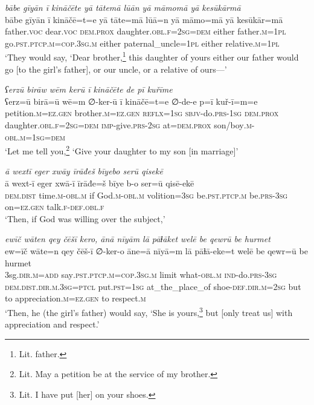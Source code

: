 \ea \label{RE.4}
\textit{bābe gīyān ī kināčēte yā tātemā lūān yā māmomā yā kesūkārmā} \\ 
\gll bābe gīyān ī kināčē=t=e yā tāte=mā lūā=n yā māmo=mā yā kesūkār=mā \\ 
 father.\textsc{voc} dear.\textsc{voc} \textsc{dem.prox} daughter\textsc{.obl}\textsc{.f}\textsc{=\textsc{2sg}}\textsc{=dem} either father\textsc{.m}\textsc{=\textsc{1pl}} go\textsc{.pst}\textsc{.ptcp}\textsc{.m}\textsc{=cop}\textsc{.3sg}\textsc{.m} either paternal\_uncle\textsc{=\textsc{1pl}} either relative\textsc{.m}\textsc{=\textsc{1pl}} \\ 
\glt `They would say, ‘Dear brother,\footnote{Lit. father.} this daughter of yours \—either our father would go [to the girl’s father], or our uncle, or a relative of ours—'
\z 
 
\ea \label{RE.7}
\textit{ʕerzū birāw wēm kerū ī kināčēte de pī kuřīme} \\ 
\gll ʕerz=ū birā=ū wē=m ∅-ker-ū ī kināčē=t=e ∅-de-e p=ī kuř-ī=m=e \\ 
 petition\textsc{.m}\textsc{\textsc{=ez.gen}} brother\textsc{.m}\textsc{\textsc{=ez.gen}} \textsc{reflx}\textsc{=\textsc{1sg}} \textsc{sbjv-}do\textsc{.prs}\textsc{-\textsc{1sg}} \textsc{dem.prox} daughter\textsc{.obl}\textsc{.f}\textsc{=\textsc{2sg}}\textsc{=dem} \textsc{imp-}give\textsc{.prs}-\textsc{2sg} at=\textsc{dem.prox} son/boy\textsc{.m}\textsc{-obl}\textsc{.m}\textsc{=\textsc{1sg}}\textsc{=dem} \\ 
\glt `Let me tell you,\footnote{Lit. May a petition be at the service of my brother.} ‘Give your daughter to my son [in marriage]'
\z 
 
\ea \label{RE.8}
\textit{ā wextī eger xwāy īrāđeš bīyebo serū qisekē} \\ 
\gll ā wext-ī eger xwā-ī īrāđe=š bīye b-o ser=ū qisē-ekē \\ 
 \textsc{dem.dist} time\textsc{.m}\textsc{-obl}\textsc{.m} if God\textsc{.m}\textsc{-obl}\textsc{.m} volition\textsc{=3sg} be\textsc{.pst}\textsc{.ptcp}\textsc{.m} be\textsc{.prs}\textsc{-3sg} on\textsc{\textsc{=ez.gen}} talk\textsc{.f}\textsc{-def}\textsc{.obl}\textsc{.f} \\ 
\glt `Then, if God was willing over the subject,'
\z 
 
\ea \label{RE.10}
\textit{ewīč wāten qey čēšī kero, ānā nīyām lā pāɫāket welē be qewrū be hurmet} \\ 
\gll ew=īč wāte=n qey čēš-ī ∅-ker-o āne=ā nīyā=m lā pāɫā-eke=t welē be qewr=ū be hurmet \\ 
 3sg\textsc{.dir}\textsc{.m}\textsc{=add} say\textsc{.pst}\textsc{.ptcp}\textsc{.m}\textsc{=cop}\textsc{.3sg}\textsc{.m} limit what\textsc{-obl}\textsc{.m} \textsc{ind-}do\textsc{.prs}\textsc{-3sg} \textsc{dem.dist}\textsc{.dir}\textsc{.m}\textsc{.3sg}=\textsc{ptcl} put\textsc{.pst}\textsc{=\textsc{1sg}} at\_the\_place\_of shoe\textsc{-def}\textsc{.dir}\textsc{.m}\textsc{=\textsc{2sg}} but to appreciation\textsc{.m}\textsc{\textsc{=ez.gen}} to respect\textsc{.m} \\ 
\glt `Then, he (the girl’s father) would say, ‘She is yours,\footnote{Lit. I have put [her] on your shoes.} but [only treat us] with appreciation and respect.'
\z 
 
